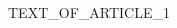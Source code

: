 \documentclass{article}
\date{\today}
\begin{document}
\maketitle

\begin{multicols}{3}

TEXT_OF_ARTICLE_1

\closearticle

\end{multicols}
\end{document}
